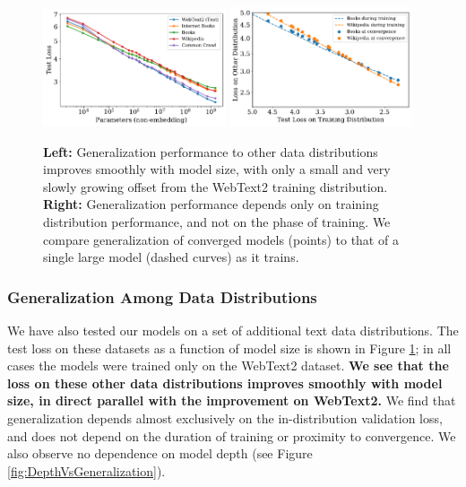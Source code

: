 \documentclass[english]{article}
\begin{document}
\begin{figure}
\noindent \centering{} \includegraphics[width=0.48\textwidth]{GeneralizationVsModelSize}\hfill
\noindent \centering{} \includegraphics[width=0.48\textwidth]{TrainingVsConvergence}
\caption[Generalization to other test datasets]{
\textbf{Left:} Generalization performance to other data distributions improves smoothly with model size, with only a small and very slowly growing offset from the WebText2 training distribution.
\textbf{Right:} Generalization performance depends only on training distribution performance, and not on the phase of training.  We compare generalization of converged models (points) to that of a single large model (dashed curves) as it trains.
\label{fig:GeneralizationVsModelSize}}
\end{figure}

\subsubsection{Generalization Among Data Distributions}
\label{sec:GeneralizationtoOtherDistributions}


We have also tested our models on a set of additional text data distributions.  The test loss on these datasets as a function of model size is shown in Figure \ref{fig:GeneralizationVsModelSize}; in all cases the models were trained only on the WebText2 dataset.  \textbf{We see that the loss on these other data distributions improves smoothly with model size, in direct parallel with the improvement on WebText2.}  We find that generalization depends almost exclusively on the in-distribution validation loss, and does not depend on the duration of training or proximity to convergence. We also observe no dependence on model depth (see Figure \ref{fig:DepthVsGeneralization}).
\end{document}
